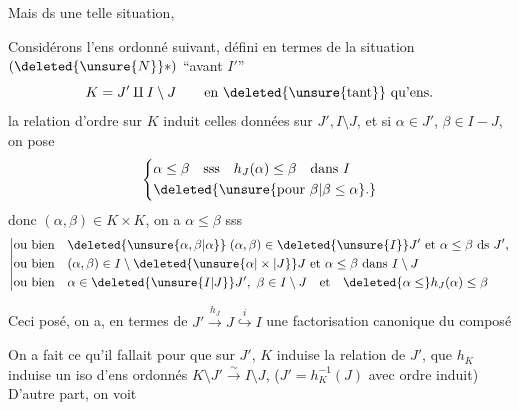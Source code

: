 
 Mais ds une telle situation,

Considérons l'ens ordonné suivant, défini en termes de la situation $(\deleted{\unsure{N}}*)$ ``avant $I'$''
\[
 K=J'\mathbin{\amalg} I\setminus J\qquad\text{en \deleted{\unsure{tant}} qu'ens.}
\]
la relation d'ordre sur $K$ induit celles données sur $J',I\setminus J$, et si $\alpha\in J'$, $\beta\in I-J$, on pose
\[
\left\{\begin{aligned}
 &\alpha\leq\beta\quad\text{sss}\quad h_J(\alpha)\leq\beta\quad\text{dans }I\\
 &\deleted{\unsure{\text{pour }\beta|\beta\leq\alpha}.}
\end{aligned}\right.
\]
donc $(\alpha,\beta)\in K\times K$, on a $\alpha\leq\beta$ sss
\[
\left|\begin{aligned}
 &\text{ou bien}\quad \deleted{\unsure{\alpha,\beta|\alpha}}\;(\alpha,\beta)\in\deleted{\unsure{I}}J' \ \text{et}\ \alpha\leq\beta\ \text{ds }J',\\
 &\text{ou bien}\quad (\alpha,\beta)\in I\setminus\deleted{\unsure{\alpha|\times|J}}J\ \text{et}\ \alpha\leq\beta\ \text{dans }I\setminus J\\
 &\text{ou bien}\quad \alpha\in\deleted{\unsure{I|J}}J',\ \beta\in I\setminus J\quad\text{et}\quad \deleted{\alpha\leq}h_J(\alpha)\leq\beta
\end{aligned}\right.
\]

Ceci posé, on a, en termes de $J'\xrightarrow{h_J}J\overset{i}{\hookrightarrow}I$ une factorisation canonique du composé

On a fait ce qu'il fallait pour que sur $J'$, $K$ induise la relation de $J'$, que $h_K$ induise un iso d'ens ordonnés $K\setminus J'\xrightarrow{\sim}I\setminus J$,     ($J'=h_K^{-1}(J)$ avec ordre induit) D'autre part, on voit
